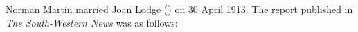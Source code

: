 
Norman Martin married Joan Lodge () on 30 April 1913. The report published in \emph{The South-Western News} was as follows:\cite{SouthWestNews1913}
